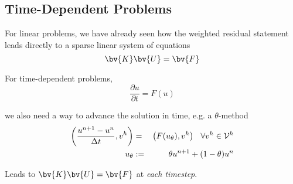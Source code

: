 \subsection*{Time-Dependent Problems}
\begin{frame}%

  \begin{itemize}
	{
	\item{For linear problems, we have already seen how
	  the weighted residual statement
	  leads directly to a sparse linear system of equations
	  \begin{equation}
	    \nonumber
	    \bv{K} \bv{U} = \bv{F}
	  \end{equation}
	}
	}
	{
	\item{For time-dependent problems, 
	  \begin{equation}
	    \nonumber
	    \frac{\partial u}{\partial t} = F(u)
	  \end{equation}
	}
	\item{we also need a way to advance the
	  solution in time, e.g. a $\theta$-method
	  \begin{eqnarray}
	    \nonumber
	    \left( \frac{ u^{n+1} - u^n}{\Delta t}, v^h\right) &=& \left(F(u_{\theta}), v^h\right)
	    \hspace{.1in} \forall v^h \in \mathcal{V}^h
	    \\ \nonumber
	    u_{\theta} &:=& \theta u^{n+1} + (1-\theta)u^n
	  \end{eqnarray}
	\item{Leads to $\bv{K} \bv{U} = \bv{F}$ at \emph{each timestep}.}
	}
	}
  \end{itemize}
\end{frame}




